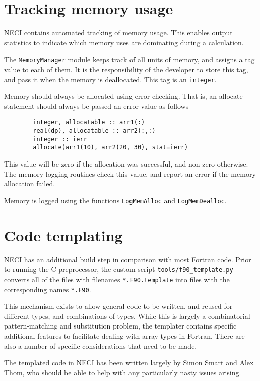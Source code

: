 \documentclass[a4paper,notitlepage]{scrreprt}
\let\code\lstinline
\begin{document}
\section{Tracking memory usage}
	NECI contains automated tracking of memory usage. This enables output
	statistics to indicate which memory uses are dominating during a
	calculation.
	
	The \code{MemoryManager} module keeps track of all units of memory, and
	assigns a tag value to each of them. It is the responsibility of the
	developer to store this tag, and pass it when the memory is deallocated.
	This tag is an \code{integer}.
	
	Memory should always be allocated using error checking. That is, an
	allocate statement should always be passed an error value as follows
	\begin{lstlisting}
		integer, allocatable :: arr1(:)
		real(dp), allocatable :: arr2(:,:)
		integer :: ierr
		allocate(arr1(10), arr2(20, 30), stat=ierr)
	\end{lstlisting}
	This value will be zero if the allocation was successful, and non-zero
	otherwise. The memory logging routines check this value, and report an
	error if the memory allocation failed.
	
	Memory is logged using the functions \code{LogMemAlloc} and 
	\code{LogMemDealloc}.
	
	

\section{Code templating}
\label{sect:templating}
	NECI has an additional build step in comparison with most Fortran code.
	Prior to running the C preprocessor, the custom script
	\code{tools/f90_template.py} converts all of the files with filenames
	\code{*.F90.template} into files with the corresponding names
	\code{*.F90}.

	This mechanism exists to allow general code to be written, and reused for
	different types, and combinations of types. While this is largely a
	combinatorial pattern-matching and substitution problem, the templater
	contains specific additional features to facilitate dealing with array
	types in Fortran. There are also a number of specific considerations that
	need to be made.

	The templated code in NECI has been written largely by Simon Smart and Alex
	Thom, who should be able to help with any particularly nasty issues
	arising.
\end{document}
